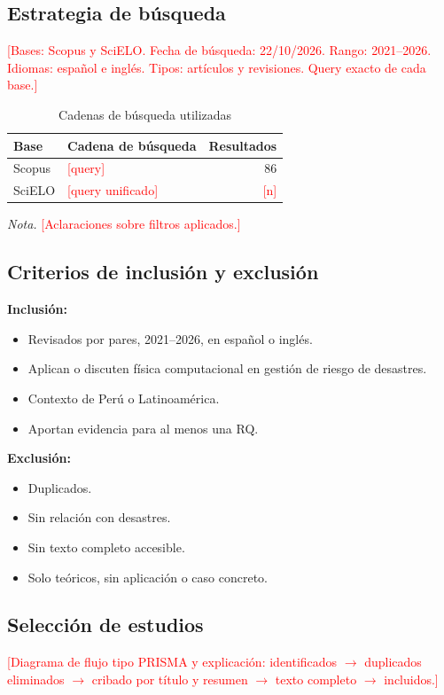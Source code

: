 \documentclass[12pt,a4paper]{article}
\newcommand{\relleno}[1]{\textcolor{red}{[#1]}}
\begin{document}
\subsection{Estrategia de búsqueda}
\relleno{Bases: Scopus y SciELO. Fecha de búsqueda: 22/10/2026. Rango: 2021--2026. Idiomas: español e inglés. Tipos: artículos y revisiones. Query exacto de cada base.}

\begin{table}[ht]
  \centering
  \caption{Cadenas de búsqueda utilizadas}
  \label{tab:queries}
  \begin{tabular}{@{}p{2.5cm}p{9cm}r@{}}
    \toprule
    Base & Cadena de búsqueda & Resultados \\
    \midrule
    Scopus & \relleno{query} & 86 \\
    SciELO & \relleno{query unificado} & \relleno{n} \\
    \bottomrule
  \end{tabular}
  \par\smallskip\noindent\small\textit{Nota.} \relleno{Aclaraciones sobre filtros aplicados.}
\end{table}

\subsection{Criterios de inclusión y exclusión}
\textbf{Inclusión:}
\begin{itemize}
  \item Revisados por pares, 2021--2026, en español o inglés.
  \item Aplican o discuten física computacional en gestión de riesgo de desastres.
  \item Contexto de Perú o Latinoamérica.
  \item Aportan evidencia para al menos una RQ.
\end{itemize}
\textbf{Exclusión:}
\begin{itemize}
  \item Duplicados.
  \item Sin relación con desastres.
  \item Sin texto completo accesible.
  \item Solo teóricos, sin aplicación o caso concreto.
\end{itemize}

\subsection{Selección de estudios}
\relleno{Diagrama de flujo tipo PRISMA y explicación: identificados $\rightarrow$ duplicados eliminados $\rightarrow$ cribado por título y resumen $\rightarrow$ texto completo $\rightarrow$ incluidos.}
\end{document}
